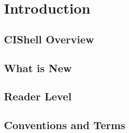 \chapter{Introduction}
\section{CIShell Overview}
\section{What is New}
\section{Reader Level}
\section{Conventions and Terms}